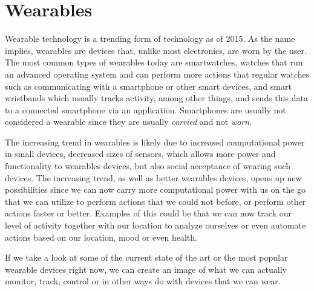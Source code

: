 \section{Wearables}\label{sec:wearables} %
Wearable technology is a trending form of technology as of 2015.  As the name implies, wearables are devices that, unlike most electronics, are worn by the user. The most common types of wearables today are smartwatches, \ie watches that run an advanced operating system and can perform more actions that regular watches such as communicating with a smartphone or other smart devices, and smart wristbands which usually tracks activity, among other things, and sends this data to a connected smartphone via an application. Smartphones are usually not considered a wearable since they are usually \emph{carried} and not \emph{worn}. 

The increasing trend in wearables is likely due to increased computational power in small devices, decreased sizes of sensors, which allows more power and functionality to wearables devices, but also social acceptance of wearing such devices.  The increasing trend, as well as better wearables devices, opens up new possibilities since we can now carry more computational power with us on the go that we can utilize to perform actions that we could not before, or perform other actions faster or better. Examples of this could be that we can now track our level of activity together with our location to analyze ourselves or even automate actions based on our location, mood or even health. 

If we take a look at some of the current state of the art or the most popular wearable devices right now, we can create an image of what we can actually monitor, track, control or in other ways do with devices that we can wear. 
